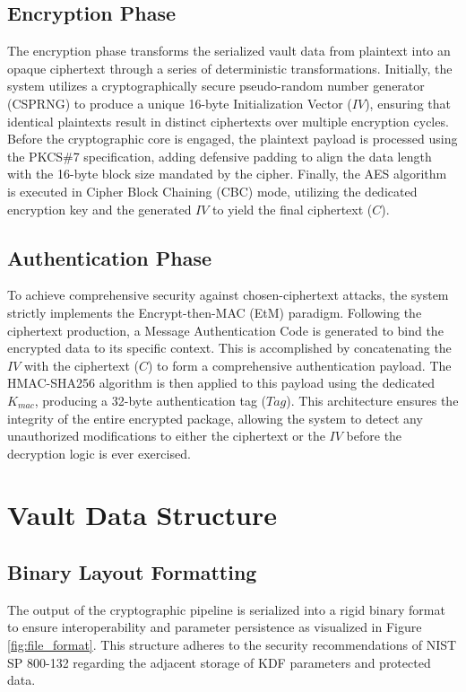 \subsection{Encryption Phase}
The encryption phase transforms the serialized vault data from plaintext into an opaque ciphertext through a series of deterministic transformations. Initially, the system utilizes a cryptographically secure pseudo-random number generator (CSPRNG) to produce a unique 16-byte Initialization Vector ($IV$), ensuring that identical plaintexts result in distinct ciphertexts over multiple encryption cycles. Before the cryptographic core is engaged, the plaintext payload is processed using the PKCS\#7 specification, adding defensive padding to align the data length with the 16-byte block size mandated by the cipher. Finally, the AES algorithm is executed in Cipher Block Chaining (CBC) mode, utilizing the dedicated encryption key and the generated $IV$ to yield the final ciphertext ($C$).

\subsection{Authentication Phase}
To achieve comprehensive security against chosen-ciphertext attacks, the system strictly implements the Encrypt-then-MAC (EtM) paradigm. Following the ciphertext production, a Message Authentication Code is generated to bind the encrypted data to its specific context. This is accomplished by concatenating the $IV$ with the ciphertext ($C$) to form a comprehensive authentication payload. The HMAC-SHA256 algorithm is then applied to this payload using the dedicated $K_{mac}$, producing a 32-byte authentication tag ($Tag$). This architecture ensures the integrity of the entire encrypted package, allowing the system to detect any unauthorized modifications to either the ciphertext or the $IV$ before the decryption logic is ever exercised.

\section{Vault Data Structure}

\subsection{Binary Layout Formatting}
The output of the cryptographic pipeline is serialized into a rigid binary format to ensure interoperability and parameter persistence as visualized in Figure \ref{fig:file_format}. This structure adheres to the security recommendations of NIST SP 800-132 regarding the adjacent storage of KDF parameters and protected data. 

